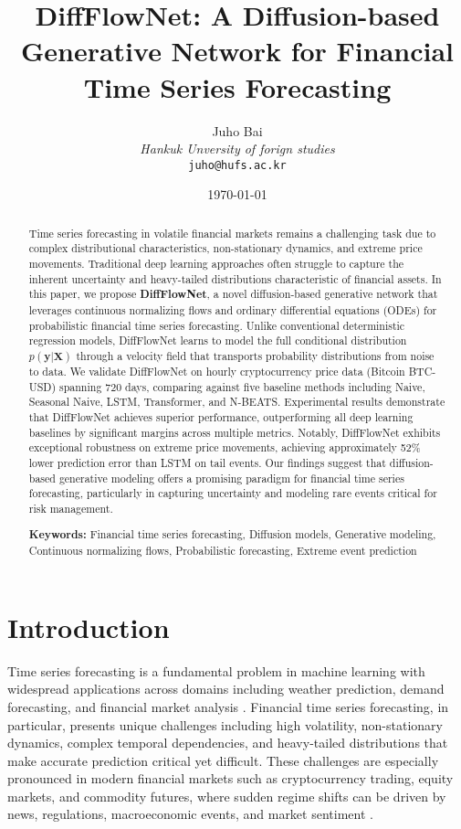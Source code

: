 \documentclass[11pt,a4paper]{article}
\title{DiffFlowNet: A Diffusion-based Generative Network for Financial Time Series Forecasting}
\author{
  Juho Bai\\
  \textit{Hankuk Unversity of forign studies}\\
  \texttt{juho@hufs.ac.kr}
}
\date{\today}
\begin{document}
\maketitle

\begin{abstract}
Time series forecasting in volatile financial markets remains a challenging task due to complex distributional characteristics, non-stationary dynamics, and extreme price movements. Traditional deep learning approaches often struggle to capture the inherent uncertainty and heavy-tailed distributions characteristic of financial assets. In this paper, we propose \textbf{DiffFlowNet}, a novel diffusion-based generative network that leverages continuous normalizing flows and ordinary differential equations (ODEs) for probabilistic financial time series forecasting. Unlike conventional deterministic regression models, DiffFlowNet learns to model the full conditional distribution $p(\mathbf{y}|\mathbf{X})$ through a velocity field that transports probability distributions from noise to data. We validate DiffFlowNet on hourly cryptocurrency price data (Bitcoin BTC-USD) spanning 720 days, comparing against five baseline methods including Naive, Seasonal Naive, LSTM, Transformer, and N-BEATS. Experimental results demonstrate that DiffFlowNet achieves superior performance, outperforming all deep learning baselines by significant margins across multiple metrics. Notably, DiffFlowNet exhibits exceptional robustness on extreme price movements, achieving approximately 52\% lower prediction error than LSTM on tail events. Our findings suggest that diffusion-based generative modeling offers a promising paradigm for financial time series forecasting, particularly in capturing uncertainty and modeling rare events critical for risk management.

\vspace{0.3cm}
\noindent\textbf{Keywords:} Financial time series forecasting, Diffusion models, Generative modeling, Continuous normalizing flows, Probabilistic forecasting, Extreme event prediction
\end{abstract}

\section{Introduction}

Time series forecasting is a fundamental problem in machine learning with widespread applications across domains including weather prediction, demand forecasting, and financial market analysis \cite{box2015time,hyndman2018forecasting}. Financial time series forecasting, in particular, presents unique challenges including high volatility, non-stationary dynamics, complex temporal dependencies, and heavy-tailed distributions that make accurate prediction critical yet difficult. These challenges are especially pronounced in modern financial markets such as cryptocurrency trading, equity markets, and commodity futures, where sudden regime shifts can be driven by news, regulations, macroeconomic events, and market sentiment \cite{mcnally2018predicting,livieris2020cnn}.
\end{document}
